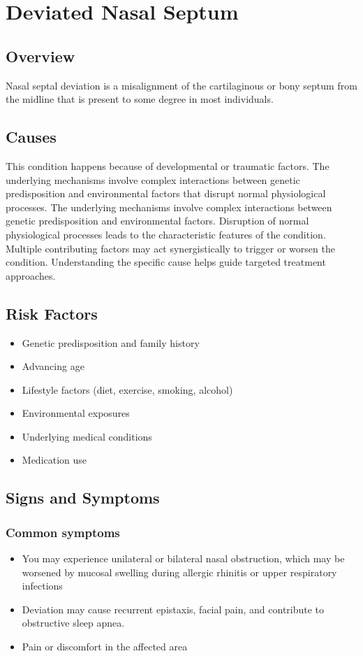 \chapter{Deviated Nasal Septum}
\label{sec:Deviated Nasal Septum}

\section{Overview}
Nasal septal deviation is a misalignment of the cartilaginous or bony septum from the midline that is present to some degree in most individuals.
\section{Causes}
This condition happens because of developmental or traumatic factors. The underlying mechanisms involve complex interactions between genetic predisposition and environmental factors that disrupt normal physiological processes. The underlying mechanisms involve complex interactions between genetic predisposition and environmental factors. Disruption of normal physiological processes leads to the characteristic features of the condition. Multiple contributing factors may act synergistically to trigger or worsen the condition. Understanding the specific cause helps guide targeted treatment approaches.
\section{Risk Factors}


\begin{itemize}[noitemsep]
  \item Genetic predisposition and family history
  \item Advancing age
  \item Lifestyle factors (diet, exercise, smoking, alcohol)
  \item Environmental exposures
  \item Underlying medical conditions
  \item Medication use
\end{itemize}
\section{Signs and Symptoms}

\subsection{Common symptoms}
\begin{itemize}[noitemsep]
  \item You may experience unilateral or bilateral nasal obstruction, which may be worsened by mucosal swelling during allergic rhinitis or upper respiratory infections
  \item Deviation may cause recurrent epistaxis, facial pain, and contribute to obstructive sleep apnea.
  \item Pain or discomfort in the affected area
  \end{itemize}


